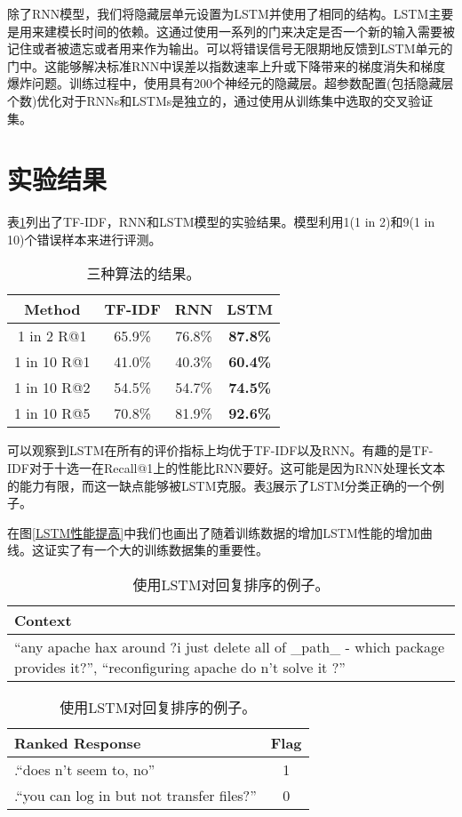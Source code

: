 \documentclass{article}
\begin{document}
\begin{multicols}{2}
		除了RNN模型，我们将隐藏层单元设置为LSTM并使用了相同的结构。LSTM主要是用来建模长时间的依赖。这通过使用一系列的门来决定是否一个新的输入需要被记住或者被遗忘或者用来作为输出。可以将错误信号无限期地反馈到LSTM单元的门中。这能够解决标准RNN中误差以指数速率上升或下降带来的梯度消失和梯度爆炸问题。训练过程中，使用具有200个神经元的隐藏层。超参数配置(包括隐藏层个数)优化对于RNNs和LSTMs是独立的，通过使用从训练集中选取的交叉验证集。
	\section{实验结果}
	
	表\ref{实验结果}列出了TF-IDF，RNN和LSTM模型的实验结果。模型利用1(1 in 2)和9(1 in 10)个错误样本来进行评测。
	
	\begin{table}[H]
		\centering
		\begin{tabular}{|c|c|c|c|}
			\hline
			Method & TF-IDF & RNN & LSTM \\
			\hline
			1 in 2 R@1 & 65.9\% & 76.8\%  & \bfseries 87.8\% \\
			\hline
			1 in 10 R@1 & 41.0\% & 40.3\% & \bfseries 60.4\% \\
			\hline
			1 in 10 R@2 & 54.5\%  & 54.7\% & \bfseries 74.5\% \\
			\hline
			1 in 10 R@5 & 70.8\% & 81.9\% &  \bfseries 92.6\% \\
			\hline  
		\end{tabular}
		\caption{三种算法的结果。}
		\label{实验结果}
	\end{table}
	
	可以观察到LSTM在所有的评价指标上均优于TF-IDF以及RNN。有趣的是TF-IDF对于十选一在Recall@1上的性能比RNN要好。这可能是因为RNN处理长文本的能力有限，而这一缺点能够被LSTM克服。表\ref{LSTM例子}展示了LSTM分类正确的一个例子。
	
	在图\ref{LSTM性能提高}中我们也画出了随着训练数据的增加LSTM性能的增加曲线。这证实了有一个大的训练数据集的重要性。
	
	\begin{table}[H]
		\centering
		\begin{tabular}{|p{6cm}|}
			\hline
			Context \\
			\hline
			“any apache hax around ?i just delete all of \_path\_ - which package provides it?”, “reconfiguring apache do n't solve it ?” \\
			\hline
		\end{tabular}
	
		\begin{tabular}{|p{5cm}|c|}
			\hline
			\centering Ranked Response & Flag \\
			\hline
			\centering 1.“does n't seem to, no” & 1 \\
			\hline
			\centering 2.“you can log in but not transfer files?” & 0 \\
			\hline
		\end{tabular}
		\caption{使用LSTM对回复排序的例子。}
		\label{LSTM例子}
	\end{table}
	

\end{multicols}
\end{document}
